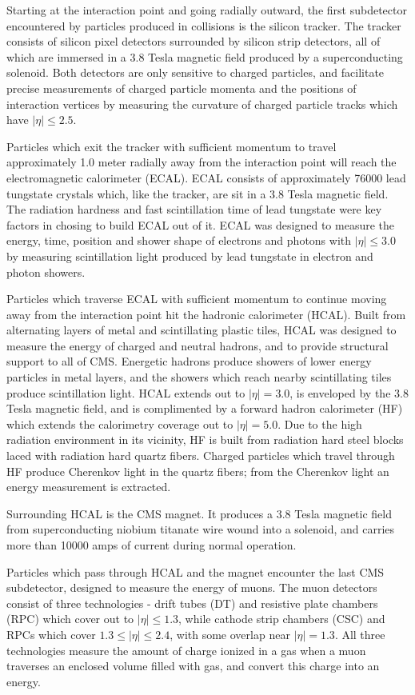 Starting at the interaction point and going radially outward, the first subdetector encountered by particles produced in collisions is the silicon tracker.
The tracker consists of silicon pixel detectors surrounded by silicon strip detectors, all of which are immersed in a 3.8 Tesla magnetic field produced by a superconducting solenoid.
Both detectors are only sensitive to charged particles, and facilitate precise measurements of charged particle momenta
and the positions of interaction vertices by measuring the curvature of charged particle tracks which have $|\eta| \leq 2.5$.

Particles which exit the tracker with sufficient momentum to travel approximately 1.0 meter radially away from the interaction point will reach the
electromagnetic calorimeter (ECAL).  ECAL consists of approximately 76000 lead tungstate crystals which, like the tracker, are sit in a 3.8 Tesla
magnetic field.  The radiation hardness and fast scintillation time of lead tungstate were key factors in chosing to build ECAL out of it.
ECAL was designed to measure the energy, time, position and shower shape of electrons and photons with $|\eta| \leq 3.0$ by measuring scintillation
light produced by lead tungstate in electron and photon showers.

Particles which traverse ECAL with sufficient momentum to continue moving away from the interaction point hit the hadronic calorimeter (HCAL).  Built
from alternating layers of metal and scintillating plastic tiles, HCAL was designed to measure the energy of charged and neutral
hadrons, and to provide structural support to all of CMS.  Energetic hadrons produce showers of lower energy particles in metal layers, and the
showers which reach nearby scintillating tiles produce scintillation light.
HCAL extends out to $|\eta| = 3.0$, is enveloped by the 3.8 Tesla magnetic field, and
is complimented by a forward hadron calorimeter (HF) which extends the calorimetry coverage out to $|\eta| = 5.0$.  Due to the high radiation
environment in its vicinity, HF is built from radiation hard steel blocks laced with radiation hard quartz fibers.  Charged particles which travel
through HF produce Cherenkov light in the quartz fibers; from the Cherenkov light an energy measurement is extracted.

Surrounding HCAL is the CMS magnet.  It produces a 3.8 Tesla magnetic field from superconducting niobium titanate wire wound into a solenoid, and
carries more than 10000 amps of current during normal operation.

Particles which pass through HCAL and the magnet encounter the last CMS subdetector, designed to measure the energy of muons.  The muon
detectors consist of three technologies - drift tubes (DT) and resistive plate chambers (RPC) which cover out to $|\eta| \leq 1.3$, while cathode
strip chambers (CSC) and RPCs which cover $1.3 \leq |\eta| \leq 2.4$, with some overlap near $|\eta| = 1.3$.  All three technologies measure the amount
of charge ionized in a gas when a muon traverses an enclosed volume filled with gas, and convert this charge into an energy.

